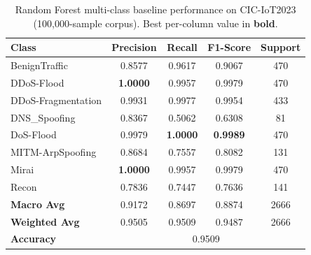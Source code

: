 \begin{table}[htbp]
\centering
\caption{Random Forest multi-class baseline performance on CIC-IoT2023
  (100{,}000-sample corpus). Best per-column value in \textbf{bold}.}
\label{tab:multiclass_rf_cic}
\begin{tabular}{lcccc}
\toprule
\textbf{Class} & \textbf{Precision} & \textbf{Recall} & \textbf{F1-Score} & \textbf{Support} \\
\midrule
BenignTraffic      & 0.8577 & 0.9617 & 0.9067 & 470 \\
DDoS-Flood         & \textbf{1.0000} & 0.9957 & 0.9979 & 470 \\
DDoS-Fragmentation & 0.9931 & 0.9977 & 0.9954 & 433 \\
DNS\_Spoofing      & 0.8367 & 0.5062 & 0.6308 &  81 \\
DoS-Flood          & 0.9979 & \textbf{1.0000} & \textbf{0.9989} & 470 \\
MITM-ArpSpoofing   & 0.8684 & 0.7557 & 0.8082 & 131 \\
Mirai              & \textbf{1.0000} & 0.9957 & 0.9979 & 470 \\
Recon              & 0.7836 & 0.7447 & 0.7636 & 141 \\
\midrule
\textbf{Macro Avg} & 0.9172 & 0.8697 & 0.8874 & 2666 \\
\textbf{Weighted Avg} & 0.9505 & 0.9509 & 0.9487 & 2666 \\
\textbf{Accuracy}  & \multicolumn{4}{c}{0.9509} \\
\bottomrule
\end{tabular}
\end{table}


